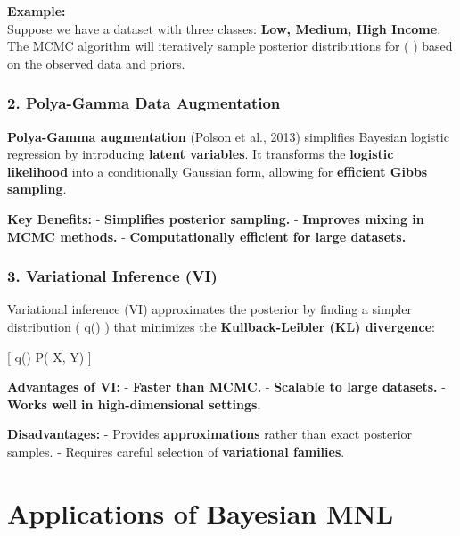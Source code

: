 \documentclass[
  letterpaper,
  DIV=11,
  numbers=noendperiod]{scrartcl}
\begin{document}
\textbf{Example:}\\
Suppose we have a dataset with three classes: \textbf{Low, Medium, High
Income}. The MCMC algorithm will iteratively sample posterior
distributions for ( \beta ) based on the observed data and priors.

\subsubsection{\texorpdfstring{2. \textbf{Polya-Gamma Data
Augmentation}}{2. Polya-Gamma Data Augmentation}}\label{polya-gamma-data-augmentation}

\textbf{Polya-Gamma augmentation} (Polson et al., 2013) simplifies
Bayesian logistic regression by introducing \textbf{latent variables}.
It transforms the \textbf{logistic likelihood} into a conditionally
Gaussian form, allowing for \textbf{efficient Gibbs sampling}.

\textbf{Key Benefits:} - \textbf{Simplifies posterior sampling.} -
\textbf{Improves mixing in MCMC methods.} - \textbf{Computationally
efficient for large datasets.}

\subsubsection{\texorpdfstring{3. \textbf{Variational Inference
(VI)}}{3. Variational Inference (VI)}}\label{variational-inference-vi}

Variational inference (VI) approximates the posterior by finding a
simpler distribution ( q(\beta) ) that minimizes the
\textbf{Kullback-Leibler (KL) divergence}:

{[} q(\beta) \approx P(\beta \textbar{} X, Y) {]}

\textbf{Advantages of VI:} - \textbf{Faster than MCMC.} -
\textbf{Scalable to large datasets.} - \textbf{Works well in
high-dimensional settings.}

\textbf{Disadvantages:} - Provides \textbf{approximations} rather than
exact posterior samples. - Requires careful selection of
\textbf{variational families}.

\section{Applications of Bayesian
MNL}\label{applications-of-bayesian-mnl}
\end{document}
